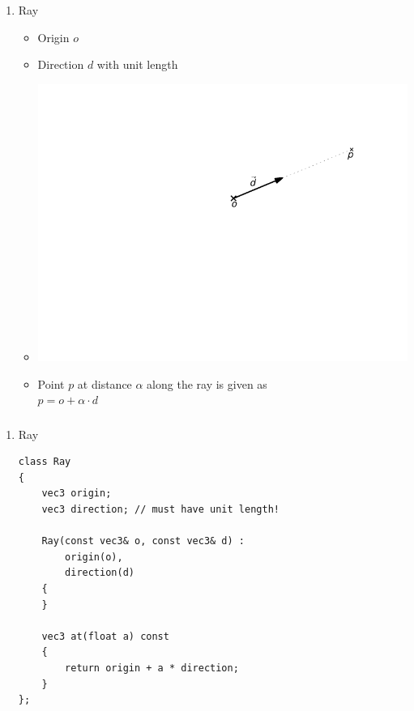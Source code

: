 \documentclass[utf8,stillsansserifmath,fleqn,t]{beamer}
\newcommand{\labelname}[1]{\def\insertenumlabel{#1}\usebeamertemplate{enumerate item}}
\begin{document}
\begin{frame}
\frametitle{\insertsection}
\begin{enumerate}
\item[\labelname{1}] Ray
    \begin{itemize}
    \item Origin $o$
    \item Direction $d$ with unit length
    \item[~] \includegraphics[width=.5\textwidth]{./fig/ray.pdf}
    \item Point $p$ at distance $\alpha$ along the ray is given as\\
        $p = o + \alpha \cdot d$
    \end{itemize}
\end{enumerate}
\end{frame}

\begin{frame}[fragile]
\frametitle{\insertsection}
\begin{enumerate}
\item[\labelname{1}] Ray
\begin{lstlisting}
class Ray
{
    vec3 origin;
    vec3 direction; // must have unit length!

    Ray(const vec3& o, const vec3& d) :
        origin(o),
        direction(d)
    {
    }

    vec3 at(float a) const
    {
        return origin + a * direction;
    }
};
\end{lstlisting}
\end{enumerate}
\end{frame}
\end{document}
